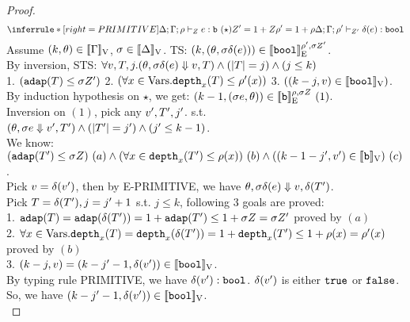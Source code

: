 \documentclass[a4paper,11pt]{article}
\theoremstyle{definition}
\begin{document}
\begin{proof}
\[
    \inferrule*[right = PRIMITIVE]{
      \Delta; \Gamma; \dmap \tvdash{\nnatA} \expr: \tbase ~ (\star) \\
      \nnatA' = 1 + \nnatA \\
      \dmap' = 1 + \dmap
    }{
      \Delta; \Gamma; \dmap' \tvdash{\nnatA'} \eop(\expr): \tbool
    }
\]
Assume $(k, \theta) \in [\![ \Gamma ]\!]_{\text{V}}$, $ \sigma \in [\![ \Delta ]\!]_{\text{V}}$. TS: $(k, (\theta, \sigma \delta(e))) \in [\![ \mathtt{bool} ]\!]_{\text{E}}^{\rho', \sigma Z'}$.\\
%
By inversion, STS: $\forall v, T, j. (\theta, \sigma \delta(e) \mathrel{\Downarrow} v, T) \land (|T| = j) \land (j \leq k)$\\
%
1. $(\mathtt{adap}(T) \leq \sigma Z')$
%
2. $(\forall x \in \mbox{Vars}. \mathtt{depth}_{x}(T) \leq \rho'(x))$
%
3. $((k - j, v) \in [\![ \mathtt{bool} ]\!]_{\text{V}})$.\\
%
By induction hypothesis on $\star$, we get: $(k-1, (\sigma e, \theta)) \in [\![ \mathtt{b} ]\!]_{\text{E}}^{\rho, \sigma Z} ~ (1)$.\\
%
Inversion on $(1)$, pick any $ v', T', j'$. s.t. $ (\theta, \sigma e \mathrel{\Downarrow} v', T') \land (|T'| = j') \land (j' \leq k-1)$.\\
%
We know: $(\mathtt{adap}(T') \leq \sigma Z) ~ (a)
\land (\forall x \in \mathtt{depth}_{x}(T') \leq \rho(x)) ~ (b)
\land ((k -1- j', v') \in [\![ \mathtt{b} ]\!]_{\text{V}}) ~ (c)$.\\
%
Pick $v = \delta(v')$, then by E-PRIMITIVE, we have $\theta, \sigma \delta(e) \mathrel{\Downarrow} v, \delta(T')$.\\
%
Pick $T = \delta(T'), j = j' + 1$ s.t.  $j \leq k$, following 3 goals are proved:\\
%
1. $\mathtt{adap}(T) = \mathtt{adap}(\delta(T')) = 1 + \mathtt{adap}(T') \leq 1 + \sigma Z = \sigma Z'$ proved by $(a)$\\
%
2. $\forall x \in \mbox{Vars}. \mathtt{depth}_{x}(T) = \mathtt{depth}_{x}(\delta(T')) = 1 + \mathtt{depth}_{x}(T') \leq 1 + \rho(x) = \rho'(x)$ proved by $(b)$\\
%
3. $(k - j, v) = (k - j' - 1, \delta(v')) \in [\![ \mathtt{bool} ]\!]_{\text{V}} $.\\
%
By typing rule PRIMITIVE, we have $\delta(v'): \mathtt{bool}$. $\delta(v')$ is either $\mathtt{true}$ or $\mathtt{false}$. So, we have $(k - j' - 1, \delta(v')) \in [\![ \mathtt{bool} ]\!]_{\text{V}}$.\\
%




\end{proof}
\end{document}
